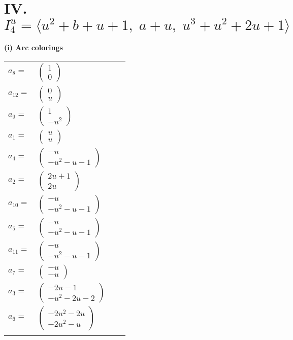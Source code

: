 \documentclass[1p]{elsarticle_modified}
\theoremstyle{definition}
\begin{document}
\centering \section*{IV. $I^u_{4}= \langle u^2+b+u+1,\;a+u,\;u^3+u^2+2 u+1 \rangle$}
\flushleft \textbf{(i) Arc colorings}\\
\begin{tabular}{m{7pt} m{180pt} m{7pt} m{180pt} }
\flushright $a_{8}=$&$\begin{pmatrix}1\\0\end{pmatrix}$ \\
\flushright $a_{12}=$&$\begin{pmatrix}0\\u\end{pmatrix}$ \\
\flushright $a_{9}=$&$\begin{pmatrix}1\\- u^2\end{pmatrix}$ \\
\flushright $a_{1}=$&$\begin{pmatrix}u\\u\end{pmatrix}$ \\
\flushright $a_{4}=$&$\begin{pmatrix}- u\\- u^2- u-1\end{pmatrix}$ \\
\flushright $a_{2}=$&$\begin{pmatrix}2 u+1\\2 u\end{pmatrix}$ \\
\flushright $a_{10}=$&$\begin{pmatrix}- u\\- u^2- u-1\end{pmatrix}$ \\
\flushright $a_{5}=$&$\begin{pmatrix}- u\\- u^2- u-1\end{pmatrix}$ \\
\flushright $a_{11}=$&$\begin{pmatrix}- u\\- u^2- u-1\end{pmatrix}$ \\
\flushright $a_{7}=$&$\begin{pmatrix}- u\\- u\end{pmatrix}$ \\
\flushright $a_{3}=$&$\begin{pmatrix}-2 u-1\\- u^2-2 u-2\end{pmatrix}$ \\
\flushright $a_{6}=$&$\begin{pmatrix}-2 u^2-2 u\\-2 u^2- u\end{pmatrix}$\\&\end{tabular}
\end{document}
